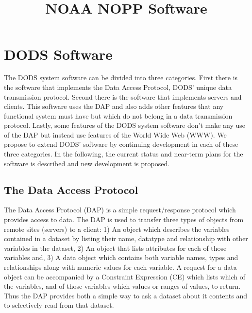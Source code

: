 \documentclass[10pt]{article}
\begin{document}
\title{NOAA NOPP Software}

\maketitle

\section{DODS Software}

The DODS system software can be divided into three categories. First there is
the software that implements the Data Access Protocol, DODS' unique data
transmission protocol. Second there is the software that implements servers
and clients. This software uses the DAP and also adds other features that any
functional system must have but which do not belong in a data transmission
protocol. Lastly, some features of the DODS system software don't make any
use of the DAP but instead use features of the World Wide Web (WWW). We
propose to extend DODS' software by continuing development in each of these
three categories. In the following, the current status and near-term plans for
the software is described and new development is proposed.


\subsection{The Data Access Protocol}

The Data Access Protocol (DAP) is a simple request/response protocol which
provides access to data. The DAP is used to transfer three types of objects
from remote sites (servers) to a client: 1) An object which describes the
variables contained in a dataset by listing their name, datatype and
relationship with other variables in the dataset, 2) An object that lists
attributes for each of those variables and, 3) A data object which contains
both variable names, types and relationships along with numeric values for
each variable. A request for a data object can be accompanied by a Constraint
Expression (CE) which lists which of the variables, and of those variables
which values or ranges of values, to return. Thus the DAP provides both a
simple way to ask a dataset about it contents and to selectively read from
that dataset.
\end{document}
